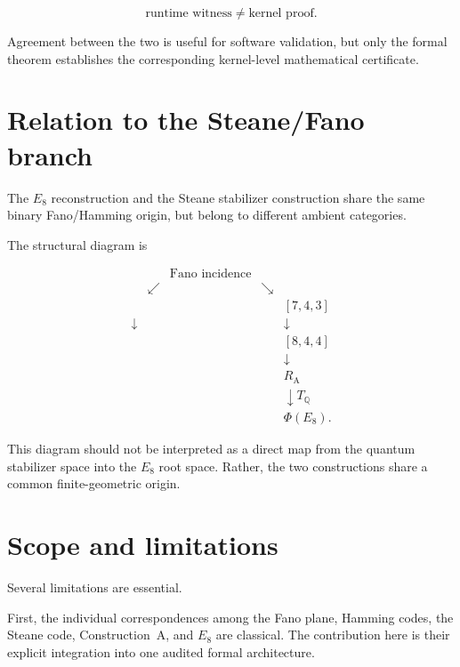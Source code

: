 \documentclass[11pt,a4paper]{article}
\theoremstyle{definition}
\theoremstyle{remark}
\newcommand{\RA}{R_{\mathrm A}}
\newcommand{\TQ}{T_{\mathbb Q}}
\begin{document}
	\[
	\boxed{
		\text{runtime witness}
		\neq
		\text{kernel proof}.
	}
	\]
	
	Agreement between the two is useful for software validation, but only the
	formal theorem establishes the corresponding kernel-level mathematical
	certificate.
	
	\section{Relation to the Steane/Fano branch}
	
	The $E_8$ reconstruction and the Steane stabilizer construction share the
	same binary Fano/Hamming origin, but belong to different ambient categories.
	
	The structural diagram is
	
	\[
	\begin{array}{ccccc}
		&&\text{Fano incidence}&&\\[1mm]
		&\swarrow&&\searrow&\\
		[7,3,4]&&&&[7,4,3]\\
		\downarrow&&&&\downarrow\\
		[[7,1,3]]&&&&[8,4,4]\\
		&&&&\downarrow\\
		&&&&\RA\\
		&&&&\downarrow\TQ\\
		&&&&\Phi(E_8).
	\end{array}
	\]
	
	This diagram should not be interpreted as a direct map from the quantum
	stabilizer space into the $E_8$ root space.  Rather, the two constructions
	share a common finite-geometric origin.
	
	\section{Scope and limitations}
	
	Several limitations are essential.
	
	First, the individual correspondences among the Fano plane, Hamming codes,
	the Steane code, Construction~A, and $E_8$ are classical.  The contribution
	here is their explicit integration into one audited formal architecture.
	
\end{document}
